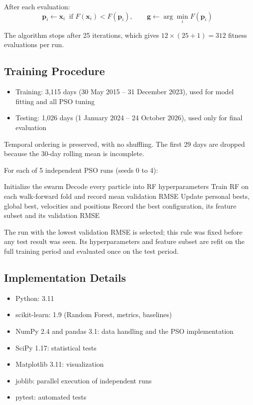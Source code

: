 After each evaluation:
\begin{equation}
\mathbf{p}_i \gets \mathbf{x}_i \ \text{ if } F(\mathbf{x}_i) < F(\mathbf{p}_i), \qquad \mathbf{g} \gets \arg\min_i F(\mathbf{p}_i)
\end{equation}

The algorithm stops after 25 iterations, which gives $12 \times (25 + 1) = 312$ fitness evaluations per run.

\subsection{Training Procedure}

\begin{itemize}
\item Training: 3,115 days (30 May 2015 -- 31 December 2023), used for model fitting and all PSO tuning
\item Testing: 1,026 days (1 January 2024 -- 24 October 2026), used only for final evaluation
\end{itemize}
Temporal ordering is preserved, with no shuffling. The first 29 days are dropped because the 30-day rolling mean is incomplete.

For each of 5 independent PSO runs (seeds 0 to 4):
\begin{algorithmic}
\State Initialize the swarm
  \State Decode every particle into RF hyperparameters
  \State Train RF on each walk-forward fold and record mean validation RMSE
  \State Update personal bests, global best, velocities and positions
\EndFor
\State Record the best configuration, its feature subset and its validation RMSE
\end{algorithmic}
The run with the lowest validation RMSE is selected; this rule was fixed before any test result was seen. Its hyperparameters and feature subset are refit on the full training period and evaluated once on the test period.

\subsection{Implementation Details}

\begin{itemize}
\item Python: 3.11
\item scikit-learn: 1.9 (Random Forest, metrics, baselines)
\item NumPy 2.4 and pandas 3.1: data handling and the PSO implementation
\item SciPy 1.17: statistical tests
\item Matplotlib 3.11: visualization
\item joblib: parallel execution of independent runs
\item pytest: automated tests
\end{itemize}

